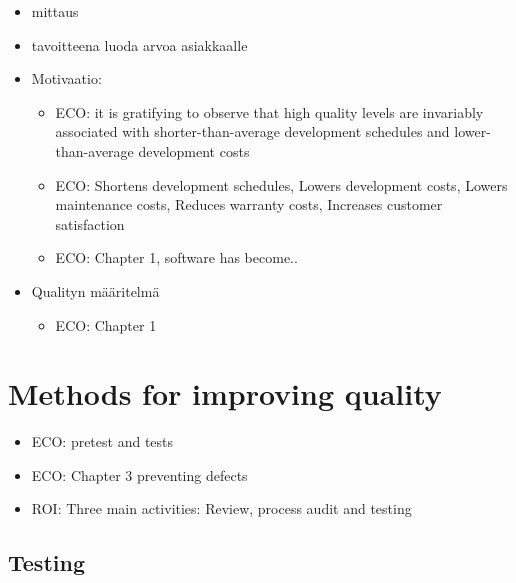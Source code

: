 \documentclass[12pt,a4paper,finnish]{tutthesis}
\begin{document}
 \begin{itemize}
 
 \item mittaus
 
 \item tavoitteena luoda arvoa asiakkaalle
 
 \item Motivaatio:
 
 \begin{itemize}
 
 \item ECO: it is gratifying to observe that high quality levels are invariably associated with shorter-than-average development schedules and lower-than-average development costs
 \item ECO: Shortens development schedules, Lowers development costs, Lowers maintenance costs, Reduces warranty costs, Increases customer satisfaction
 \item ECO: Chapter 1, software has become..
 
 \end{itemize}
 
 \item Qualityn määritelmä




 \begin{itemize}
 
 \item ECO: Chapter 1
 
 \end{itemize}
 
 \end{itemize}
 
 \section{Methods for improving quality}
 
 \begin{itemize}
 
 \item ECO: pretest and tests
 
 \item ECO: Chapter 3 preventing defects 
 
 \item ROI: Three main activities: Review, process audit and testing
 
 \end{itemize}
 
 \subsection{Testing}
 
\end{document}
